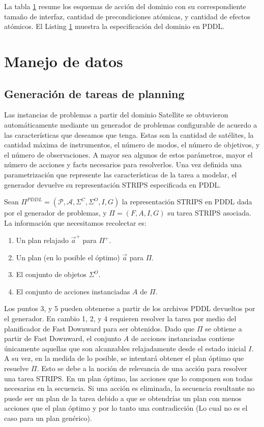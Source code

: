 La tabla \ref{} resume los esquemas de acción del dominio con su correspondiente
tamaño de interfaz, cantidad de precondiciones atómicas, y cantidad de efectos
atómicos. El Listing \ref{} muestra la especificación del dominio en PDDL.

\section{Manejo de datos}

\subsection{Generación de tareas de planning}
\label{method:data_generation}

Las instancias de problemas a partir del dominio Satellite se obtuvieron
automáticamente mediante un generador de problemas configurable de acuerdo a las
características que deseamos que tenga. Estas son la cantidad de satélites, la
cantidad máxima de instrumentos, el número de modos, el número de objetivos, y
el número de observaciones. A mayor sea algunos de estos parámetros, mayor el
número de acciones y facts necesarios para resolverlos. Una vez definida una
parametrización que represente las características de la tarea a modelar, el
generador devuelve su representación STRIPS especificada en PDDL.


Sean $\Pi^{PDDL} = (\mathcal{P}, \mathcal{A}, \Sigma^{C}, \Sigma^{O}, I, G)$ la
representación STRIPS en PDDL dada por el generador de problemas, y $\Pi = (F,
A, I, G)$ su tarea STRIPS asociada. La información que necesitamos recolectar
es:

\begin{enumerate}
    \item Un plan relajado $\vec{a}^{+}$ para $\Pi^{+}$.
    \item Un plan (en lo posible el óptimo) $\vec{a}$ para $\Pi$.
    \item El conjunto de objetos $\Sigma^{O}$.
    \item El conjunto de acciones instanciadas $A$ de $\Pi$.
\end{enumerate}

Los puntos 3, y 5 pueden obtenerse a partir de los archivos PDDL devueltos por
el generador. En cambio 1, 2, y 4 requieren resolver la tarea por medio del
planificador de Fast Downward para ser obtenidos. Dado que $\Pi$ se obtiene a
partir de Fast Downward, el conjunto $A$ de acciones instanciadas contiene
únicamente aquellas que son alcanzables relajadamente desde el estado inicial
$I$. A su vez, en la medida de lo posible, se intentará obtener el plan óptimo
que resuelve $\Pi$. Esto se debe a la noción de relevancia de una acción para
resolver una tarea STRIPS. En un plan óptimo, las acciones que lo componen son
todas necesarias en la secuencia. Si una acción es eliminada, la secuencia
resultante no puede ser un plan de la tarea debido a que se obtendrías un plan
con menos acciones que el plan óptimo y por lo tanto una contradicción (Lo cual
no es el caso para un plan genérico).

